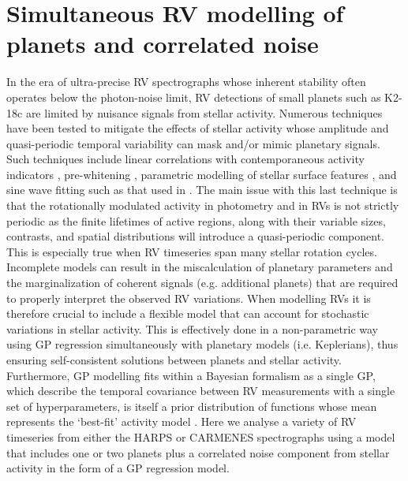 \section{Simultaneous RV modelling of planets and correlated noise} \label{k2182sect:correlated}
In the era of ultra-precise RV spectrographs whose inherent stability often operates below the photon-noise limit,
RV detections of small planets such as K2-18c are limited by nuisance signals from stellar activity. Numerous
techniques have been tested to mitigate the effects of stellar activity whose amplitude and quasi-periodic temporal
variability can mask and/or mimic planetary signals. Such techniques include linear correlations with
contemporaneous activity indicators \citep[e.g.][]{boisse09},
pre-whitening \citep[e.g.][]{queloz09},
parametric modelling of stellar surface features \citep[e.g.][]{dumusque14},
and sine wave fitting such as that used in . The main issue with this last technique is that
the rotationally modulated activity in photometry and in RVs
is not strictly periodic as the finite lifetimes of active regions, along with
their variable sizes, contrasts, and spatial distributions will introduce a quasi-periodic component. This is
especially true when RV timeseries span many stellar rotation cycles.
Incomplete models can result in the miscalculation of planetary parameters and the marginalization of coherent
signals (e.g. additional planets) that are required to properly interpret the observed RV variations. When modelling RVs
it is therefore crucial to include a flexible model that can account for stochastic variations in stellar
activity. This is effectively done in a non-parametric way using GP  regression simultaneously with
planetary models (i.e. Keplerians), thus ensuring self-consistent solutions between planets and stellar activity.
Furthermore, GP modelling fits within a Bayesian formalism as a single GP, which describe the temporal covariance between RV
measurements with a single set of hyperparameters, is itself a prior distribution of functions whose mean represents
the `best-fit' activity model \citep{haywood14,faria16,cloutier17a}.
Here we analyse a variety of RV timeseries from either the HARPS
 or CARMENES  spectrographs using a model that includes one or two
planets plus a correlated noise component from stellar activity in the form of a GP regression model.

